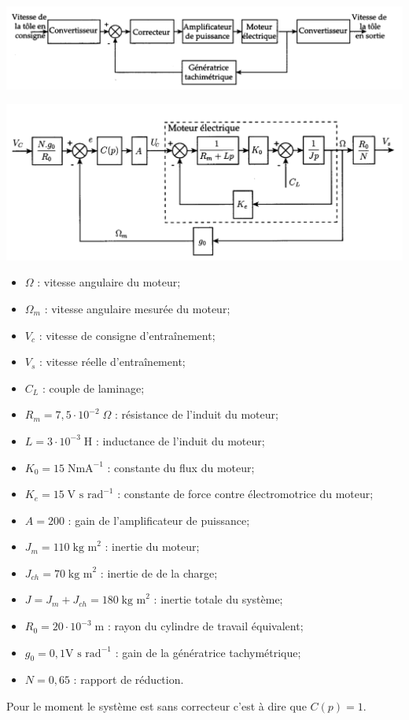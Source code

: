 \documentclass[10pt,fleqn]{article} %
\begin{document}
\begin{multicols}{2}
\begin{center}
\includegraphics[width=\linewidth]{images/figure_05}

\includegraphics[width=\linewidth]{images/figure_06}

\end{center}

\begin{itemize}
\item $\Omega$ : vitesse angulaire du moteur;
\item $\Omega_m$ : vitesse angulaire mesurée du moteur;
\item $V_c$ : vitesse de consigne d'entraînement;
\item $V_s$ : vitesse réelle d'entraînement;
\item $C_L$ : couple de laminage;
\item $R_m = 7,5 \cdot 10^{-2} \; \Omega$ : résistance de l'induit du moteur;
\item $L = 3\cdot 10^{-3}\; \text{H}$ : inductance de l'induit du moteur;
\item $K_0=15\;\text{NmA}^{-1}$ : constante du flux du moteur;
\item $K_e = 15 \; \text{V s rad}^{-1}$ : constante de force contre électromotrice du moteur;
\item $A = 200$ : gain de l'amplificateur de puissance;
\item $J_m = 110\; \text{kg m}^2$ : inertie du moteur;
\item $J_{ch} = 70\; \text{kg m}^2$ : inertie de de la charge;
\item $J=J_m+J_{ch} = 180\; \text{kg m}^2$ : inertie totale du système;
\item $R_0 = 20\cdot 10^{-3}\; \text{m}$ : rayon du cylindre de travail équivalent;
\item $g_0 = 0,1\text{V s rad}^{-1} $ : gain de la génératrice tachymétrique;
\item $N=0,65$ : rapport de réduction.
\end{itemize}
Pour le moment le système est sans correcteur c'est à dire que $C(p) = 1$.


\end{multicols}
\end{document}
